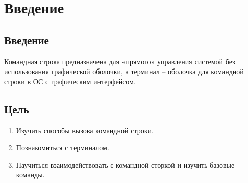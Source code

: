 \chapter{Введение}
\label{ch:intro}

\section{Введение}

Командная строка предназначена для «прямого» управления системой без использования
графической оболочки, а терминал – оболочка для командной строки в ОС с графическим
интерфейсом.

\section{Цель}  

\begin{enumerate}
    \item Изучить способы вызова командной строки.
    \item Познакомиться с терминалом.
    \item Научиться взаимодействовать с командной сторкой и изучить базовые команды.
\end{enumerate}

\endinput